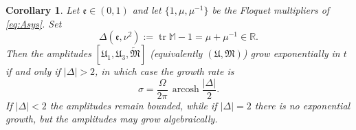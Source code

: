 \documentclass[reqno]{amsart}
\newcommand{\A}{\boldsymbol{\mathfrak{U}}}              %
\newcommand{\B}{{\mathfrak{M}}}
\newcommand{\ee}{\mathfrak{e}}
\newcommand{\tr}{\operatorname{tr}}     %
\newcommand{\arcosh}{\operatorname{arcosh}} %
\newtheorem{corollary}[theorem]{Corollary}
\begin{document}
\begin{corollary}\label{cor:discriminant}
Let $\ee\in(0,1)$ and let $\{1,\mu,\mu^{-1}\}$ be the Floquet multipliers of \eqref{eq:Asys}. Set
\begin{equation}\label{eq:Delta}
\Delta(\ee,\nu^2):=\tr\mathbb M-1=\mu+\mu^{-1}\in\mathbb R .
\end{equation}
Then the amplitudes $[\mathfrak{U}_1,\mathfrak{U}_3,\widetilde{\B}]$ (equivalently $(\A,\B)$) grow exponentially in $t$ if and only if $|\Delta|>2$, in which case the growth rate is
\begin{equation}\label{eq:sigma}
\sigma=\frac{\Omega}{2\pi}\,\arcosh\frac{|\Delta|}{2}.
\end{equation}
If $|\Delta|<2$ the amplitudes remain bounded, while if $|\Delta|=2$ there is no exponential growth, but the amplitudes may grow algebraically.
\end{corollary}
\end{document}
